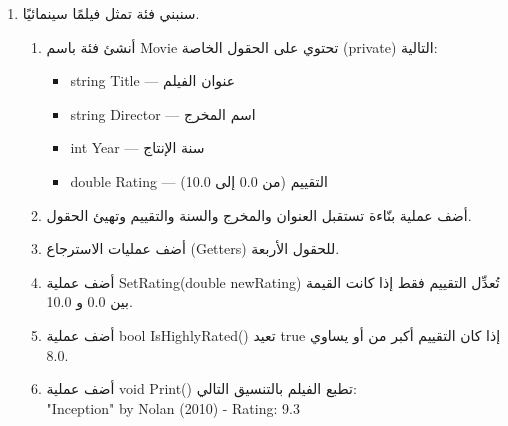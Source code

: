 \documentclass[14pt]{extarticle}
\begin{document}
\begin{enumerate}[itemsep=2em]
{\begin{boxSolution}
\begin{english}
\begin{verbatim}
s1.Print();
s2.Print();

s2.SetAverage(52.0);
Console.WriteLine("Is Khalil passing? " + s2.IsPassing());
\end{verbatim}
\end{english}
\end{boxSolution}
}
\fi
\clearpage

\item
سنبني فئة تمثل فيلمًا سينمائيًا.
\begin{enumerate}[itemsep=1em]
    \item أنشئ فئة باسم \textenglish{Movie} تحتوي على الحقول الخاصة (\textenglish{private}) التالية:
    \begin{itemize}[itemsep=1pt]
        \item \textenglish{string Title} — عنوان الفيلم
        \item \textenglish{string Director} — اسم المخرج
        \item \textenglish{int Year} — سنة الإنتاج
        \item \textenglish{double Rating} — التقييم (من 0.0 إلى 10.0)
    \end{itemize}

    \item أضف عملية بنّاءة تستقبل العنوان والمخرج والسنة والتقييم وتهيئ الحقول.

    \item أضف عمليات الاسترجاع (\textenglish{Getters}) للحقول الأربعة.

    \item أضف عملية \textenglish{SetRating(double newRating)} تُعدِّل التقييم فقط إذا كانت القيمة بين \textenglish{0.0} و \textenglish{10.0}.

    \item أضف عملية \textenglish{bool IsHighlyRated()} تعيد \textenglish{true} إذا كان التقييم أكبر من أو يساوي \textenglish{8.0}.

    \item أضف عملية \textenglish{void Print()} تطبع الفيلم بالتنسيق التالي: \\
    \textenglish{"Inception" by Nolan (2010) - Rating: 9.3}


\end{enumerate}
\end{enumerate}
\end{document}
